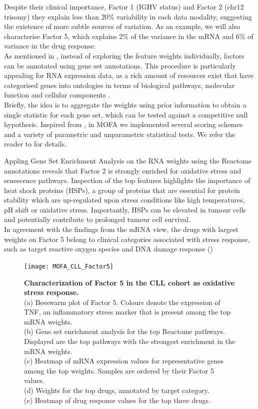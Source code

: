 Despite their clinical importance, Factor 1 (IGHV status) and Factor 2 (chr12 trisomy) they explain less than 20\% variability in each data modality, suggesting the existence of more subtle sources of variation. As an example, we will also characterise Factor 5, which explains 2\% of the variance in the mRNA and 6\% of variance in the drug response.\\
As mentioned in , instead of exploring the feature weights individually, factors can be annotated using gene set annotations. This procedure is particularly appealing for RNA expression data, as a rich amount of resources exist that have categorised genes into ontologies in terms of biological pathways, molecular function and cellular components  \cite{Fabregat2015,Ashburner2000}.\\
Briefly, the idea is to aggregate the weights using prior information to obtain a single statistic for each gene set, which can be tested against a competitive null hypothesis. Inspired from \cite{Frost2015}, in MOFA we implemented several scoring schemes and a variety of parametric and unparametric statistical tests. We refer the reader to \cite{Frost2015} for details.

Appling Gene Set Enrichment Analysis on the RNA weights using the Reactome annotations \cite{Fabregat2015} reveals that Factor 2 is strongly enriched for oxidative stress and senescence pathways. Inspection of the top features highlights the importance of heat shock proteins (HSPs), a group of proteins that are essential for protein stability which are up-regulated upon stress conditions like high temperatures, pH shift or oxidative stress. Importantly, HSPs can be elevated in tumour cells and potentially contribute to prolonged tumour cell survival\cite{Dempsey2010}.\\
In agreement with the findings from the mRNA view, the drugs with largest weights on Factor 5 belong to clinical categories associated with stress response, such as target reactive oxygen species and DNA damage response ()

\begin{figure}[H]
	\centering 	
	\texttt{[image: MOFA\_CLL\_Factor5]}
	\caption{
	\textbf{Characterization of Factor 5 in the CLL cohort as oxidative stress response.}\\
	(a) Beeswarm  plot of Factor 5. Colours denote the expression of TNF, an inflammatory stress marker that is present among the top mRNA weights.\\
	(b) Gene set enrichment analysis for the top Reactome pathways. Displayed are the top pathways with the strongest enrichment in the mRNA weights.\\
	(c) Heatmap of mRNA expression values for representative genes among the top  weights. Samples are ordered by their Factor 5 values.\\
	(d) Weights for the top drugs, annotated by target category.\\
	(e) Heatmap of drug response values for the top three drugs.
	}
	\label{fig:MOFA_CLL_Factor5}
\end{figure}


